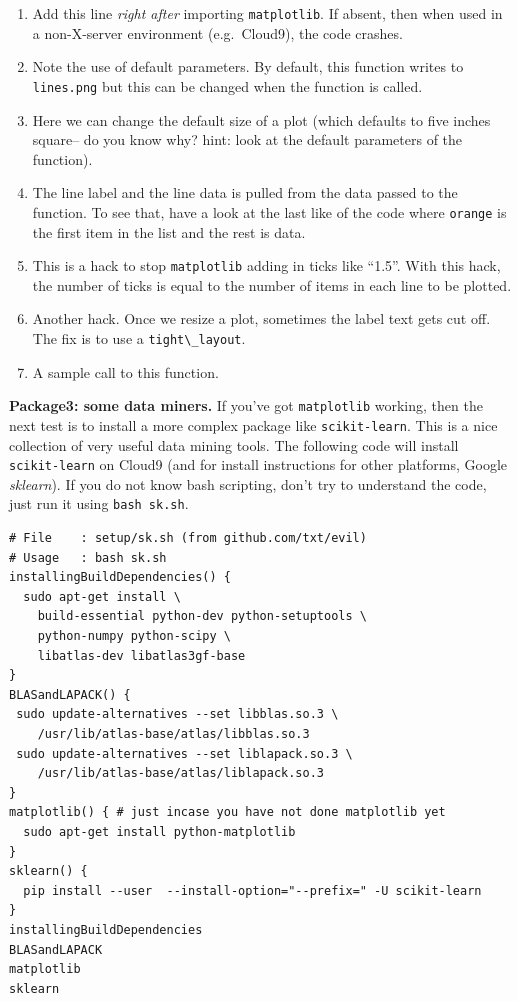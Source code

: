 \begin{enumerate}
\def\labelenumi{\arabic{enumi}.}
\itemsep1pt\parskip0pt
\item
  Add this line \emph{right after} importing \texttt{matplotlib}. If
  absent, then when used in a non-X-server environment (e.g.~Cloud9),
  the code crashes.
\item
  Note the use of default parameters. By default, this function writes
  to \texttt{lines.png} but this can be changed when the function is
  called.
\item
  Here we can change the default size of a plot (which defaults to five
  inches square-- do you know why? hint: look at the default parameters
  of the function).
\item
  The line label and the line data is pulled from the data passed to the
  function. To see that, have a look at the last like of the code where
  \texttt{orange} is the first item in the list and the rest is data.
\item
  This is a hack to stop \texttt{matplotlib} adding in ticks like
  ``1.5''. With this hack, the number of ticks is equal to the number of
  items in each line to be plotted.
\item
  Another hack. Once we resize a plot, sometimes the label text gets cut
  off. The fix is to use a \texttt{tight\textbackslash{}\_layout}.
\item
  A sample call to this function.
\end{enumerate}

\textbf{Package3: some data miners.} If you've got \texttt{matplotlib}
working, then the next test is to install a more complex package like
\texttt{scikit-learn}. This is a nice collection of very useful data
mining tools. The following code will install \texttt{scikit-learn} on
Cloud9 (and for install instructions for other platforms, Google
\emph{sklearn}). If you do not know bash scripting, don't try to
understand the code, just run it using \texttt{bash\ sk.sh}.

\begin{lstlisting}
# File    : setup/sk.sh (from github.com/txt/evil)
# Usage   : bash sk.sh
installingBuildDependencies() {
  sudo apt-get install \
    build-essential python-dev python-setuptools \
    python-numpy python-scipy \
    libatlas-dev libatlas3gf-base
}
BLASandLAPACK() { 
 sudo update-alternatives --set libblas.so.3 \
    /usr/lib/atlas-base/atlas/libblas.so.3
 sudo update-alternatives --set liblapack.so.3 \
    /usr/lib/atlas-base/atlas/liblapack.so.3
}
matplotlib() { # just incase you have not done matplotlib yet
  sudo apt-get install python-matplotlib
}
sklearn() {
  pip install --user  --install-option="--prefix=" -U scikit-learn
}
installingBuildDependencies
BLASandLAPACK
matplotlib
sklearn
\end{lstlisting}

